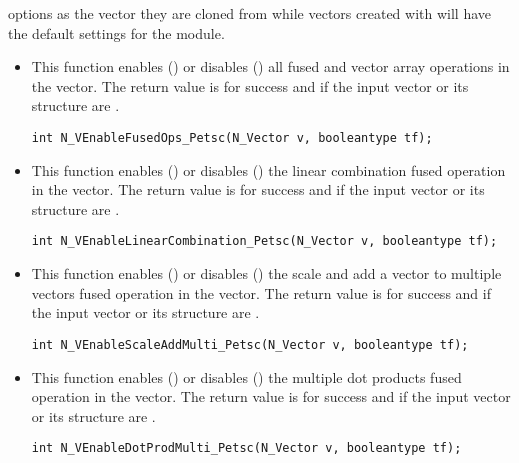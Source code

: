 options as the vector they are cloned from while vectors created with
 will have the default settings for the {\nvecpetsc} module.
\begin{itemize}


\item {}

This function enables () or disables () all fused and
vector array operations in the {\petsc} vector. The return value is  for
success and  if the input vector or its  structure are .

\verb|int N_VEnableFusedOps_Petsc(N_Vector v, booleantype tf);|


\item {}

This function enables () or disables () the linear
combination fused operation in the {\petsc} vector. The return value is  for
success and  if the input vector or its  structure are .

\verb|int N_VEnableLinearCombination_Petsc(N_Vector v, booleantype tf);|


\item {}

This function enables () or disables () the scale and
add a vector to multiple vectors fused operation in the {\petsc} vector. The
return value is  for success and  if the input vector or its
 structure are .

\verb|int N_VEnableScaleAddMulti_Petsc(N_Vector v, booleantype tf);|


\item {}

This function enables () or disables () the multiple
dot products fused operation in the {\petsc} vector. The return value is 
for success and  if the input vector or its  structure are
.

\verb|int N_VEnableDotProdMulti_Petsc(N_Vector v, booleantype tf);|


\end{itemize}

